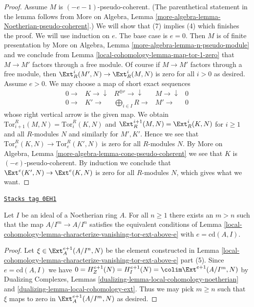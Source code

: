 \begin{proof}
\medskip\noindent
Assume $M$ is $(-e - 1)$-pseudo-coherent. (The parenthetical statement
in the lemma follows from More on Algebra, Lemma
\ref{more-algebra-lemma-Noetherian-pseudo-coherent}.)
We will show that (7) implies (4) which
finishes the proof. We will use induction on $e$.
The base case is $e = 0$. Then $M$ is of finite presentation by
More on Algebra, Lemma \ref{more-algebra-lemma-n-pseudo-module}
and we conclude from Lemma \ref{local-cohomology-lemma-map-tor-1-zero} that
$M \to M'$ factors through a free module. Of course if $M \to M'$
factors through a free module, then $\Ext^i_R(M', N) \to \Ext^i_R(M, N)$
is zero for all $i > 0$ as desired.
Assume $e > 0$. We may choose a map of short exact sequences
$$
\begin{array}{ccccc}0 \longrightarrow & K \longrightarrow\downarrow & R^{\oplus r} \longrightarrow\downarrow & M \longrightarrow\downarrow & 0 \\ 0 \longrightarrow & K' \longrightarrow & \bigoplus_{i \in I} R \longrightarrow & M' \longrightarrow & 0\end{array}
$$
whose right vertical arrow is the given map. We obtain
$\text{Tor}_{i + 1}^R(M, N) = \text{Tor}^R_i(K, N)$
and $\Ext^{i + 1}_R(M, N) = \Ext^i_R(K, N)$ for $i \geq 1$
and all $R$-modules $N$ and similarly for $M', K'$.
Hence we see that $\text{Tor}_e^R(K, N) \to \text{Tor}_e^R(K', N)$
is zero for all $R$-modules $N$. By More on Algebra, Lemma
\ref{more-algebra-lemma-cone-pseudo-coherent} we see that $K$
is $(-e)$-pseudo-coherent. By induction we conclude that
$\Ext^e(K', N) \to \Ext^e(K, N)$ is zero for all $R$-modules
$N$, which gives what we want.
\end{proof}

\begin{lemma}
\label{local-cohomology-lemma-cd-sequence-Koszul}
\href{https://stacks.math.columbia.edu/tag/0EH1}{\texttt{Stacks tag 0EH1}}

Let $I$ be an ideal of a Noetherian ring $A$.
For all $n \geq 1$ there exists an $m > n$ such that the map
$A/I^m \to A/I^n$ satisfies the equivalent conditions of
Lemma \ref{local-cohomology-lemma-characterize-vanishing-tor-ext-above-e} with
$e = \text{cd}(A, I)$.
\end{lemma}

\begin{proof}
Let $\xi \in \Ext^{e + 1}_A(A/I^n, N)$ be the element constructed in
Lemma \ref{local-cohomology-lemma-characterize-vanishing-tor-ext-above-e} part (5).
Since $e = \text{cd}(A, I)$ we have
$0 = H^{e + 1}_Z(N) = H^{e + 1}_I(N) = \colim \Ext^{e + 1}(A/I^m, N)$
by Dualizing Complexes, Lemmas
\ref{dualizing-lemma-local-cohomology-noetherian} and
\ref{dualizing-lemma-local-cohomology-ext}.
Thus we may pick $m \geq n$ such that $\xi$ maps to
zero in $\Ext^{e + 1}_A(A/I^m, N)$ as desired.
\end{proof}

